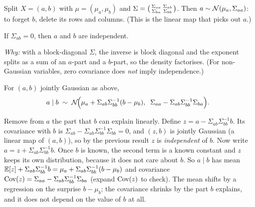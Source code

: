 \begin{result}[Marginals]
Split $X = (a, b)$ with $\mu = (\mu_a, \mu_b)$ and $\Sigma = \begin{psmallmatrix}\Sigma_{aa} &
\Sigma_{ab}\\ \Sigma_{ba} & \Sigma_{bb}\end{psmallmatrix}$. Then $a \sim \mathcal{N}(\mu_a, \Sigma_{aa})$: to forget $b$,
delete its rows and columns. (This is the linear map that picks out $a$.)
\end{result}

\begin{result}
If $\Sigma_{ab} = 0$, then $a$ and $b$ are independent.
\end{result}
\emph{Why:} with a block-diagonal $\Sigma$, the inverse is block diagonal and the exponent splits as a sum of an
$a$-part and a $b$-part, so the density factorises. (For non-Gaussian variables, zero covariance does \emph{not}
imply independence.)

\begin{result}
\label{res:condition}
For $(a, b)$ jointly Gaussian as above,
\begin{equation}
  a \mid b \;\sim\; \mathcal{N}\!\Big(\mu_a + \Sigma_{ab}\Sigma_{bb}^{-1}(b - \mu_b),\;\;
                           \Sigma_{aa} - \Sigma_{ab}\Sigma_{bb}^{-1}\Sigma_{ba}\Big).
  \label{eq:condition}
\end{equation}
\end{result}
\begin{intuition}
Remove from $a$ the part that $b$ can explain linearly. Define $z = a - \Sigma_{ab}\Sigma_{bb}^{-1} b$. Its
covariance with $b$ is $\Sigma_{ab} - \Sigma_{ab}\Sigma_{bb}^{-1}\Sigma_{bb} = 0$, and $(z, b)$ is jointly Gaussian
(a linear map of $(a,b)$), so by the previous result $z$ is \emph{independent} of $b$. Now write
$a = z + \Sigma_{ab}\Sigma_{bb}^{-1} b$. Once $b$ is known, the second term is a known constant and $z$ keeps its
own distribution, because it does not care about $b$. So $a \mid b$ has mean
$\mathbb{E}[z] + \Sigma_{ab}\Sigma_{bb}^{-1}b = \mu_a + \Sigma_{ab}\Sigma_{bb}^{-1}(b - \mu_b)$ and covariance $\operatorname{Cov}(z) =
\Sigma_{aa} - \Sigma_{ab}\Sigma_{bb}^{-1}\Sigma_{ba}$ (expand $\operatorname{Cov}(z)$ to check). The mean shifts by a regression
on the surprise $b - \mu_b$; the covariance shrinks by the part $b$ explains, and it does not depend on the value of
$b$ at all.
\end{intuition}

